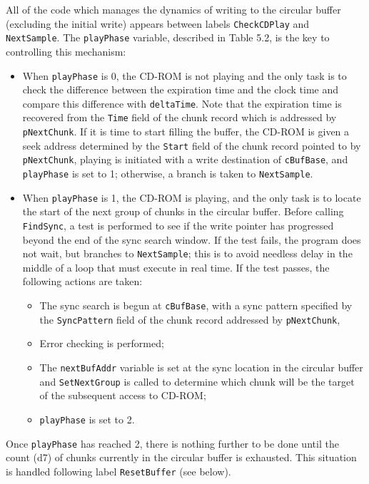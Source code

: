 \documentclass[12pt,letterpaper,twoside]{article}
\begin{document}
All of the code which manages the dynamics of writing to the circular buffer (excluding the initial write) appears between labels \texttt{CheckCDPlay} and \texttt{NextSample}. The \texttt{playPhase} variable, described in Table 5.2, is the key to controlling this mechanism:

\begin{itemize}[nosep, left=0pt .. 36pt]
\item When \texttt{playPhase} is 0, the CD-ROM is not playing and the only task is to check the difference between the expiration time and the clock time and compare this difference with \texttt{deltaTime}. Note that the expiration time is recovered from the \texttt{Time} field of the chunk record which is addressed by \texttt{pNextChunk}. If it is time to start filling the buffer, the CD-ROM is given a seek address determined by the \texttt{Start} field of the chunk record pointed to by \texttt{pNextChunk}, playing is initiated with a write destination of \texttt{cBufBase}, and \texttt{playPhase} is set to 1; otherwise, a branch is taken to \texttt{NextSample}.

\item When \texttt{playPhase} is 1, the CD-ROM is playing, and the only task is to locate the start of the next group of chunks in the circular buffer. Before calling \texttt{FindSync}, a test is performed to see if the write pointer has progressed beyond the end of the sync search window. If the test fails, the program does not wait, but branches to \texttt{NextSample}; this is to avoid needless delay in the middle of a loop that must execute in real time. If the test passes, the following actions are taken:
  \begin{itemize}[nosep]
  \item The sync search is begun at \texttt{cBufBase}, with a sync pattern specified by the \texttt{SyncPattern} field of the chunk record addressed by \texttt{pNextChunk},
  \item Error checking is performed;
  \item The \texttt{nextBufAddr} variable is set at the sync location in the circular buffer and \texttt{SetNextGroup} is called to determine which chunk will be the target of the subsequent access to CD-ROM;
  \item \texttt{playPhase} is set to 2.
  \end{itemize}
\end{itemize}

Once \texttt{playPhase} has reached 2, there is nothing further to be done until the count (d7) of chunks currently in the circular buffer is exhausted. This situation is handled following label \texttt{ResetBuffer} (see below).
\end{document}
